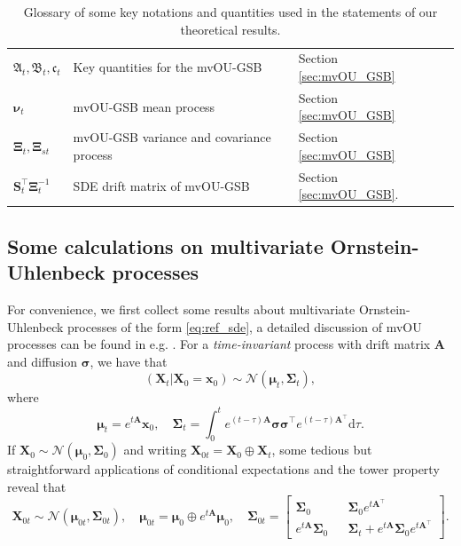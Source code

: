 \documentclass{article}
\newcommand{\diff}{\mathrm{d}}
\newcommand{\Nc}{\mathcal{N}}
\newcommand{\bmathfrak}[1]{\bm{\mathfrak{#1}}}
\theoremstyle{newstyle}
\begin{document}
\begin{table}[h]
\begin{tabular}{llll}
    $\bmathfrak{A}_t, \bmathfrak{B}_t, \bmathfrak{c}_t$ & Key quantities for the mvOU-GSB & Section \ref{sec:mvOU_GSB} \\
    $\bm{\nu}_t$ & mvOU-GSB mean process & Section \ref{sec:mvOU_GSB} \\ 
    $\bm{\Xi}_t, \bm{\Xi}_{st}$ & mvOU-GSB variance and covariance process & Section \ref{sec:mvOU_GSB} \\ 
    $\bm{S}_t^\top \bm{\Xi}_t^{-1}$ & SDE drift matrix of mvOU-GSB & Section \ref{sec:mvOU_GSB}.  \\ 
    \bottomrule
\end{tabular}
\caption{Glossary of some key notations and quantities used in the statements of our theoretical results.}
\label{tab:glossary}
\end{table}

\subsection{Some calculations on multivariate Ornstein-Uhlenbeck processes}\label{sec:mvOU_calculations}

For convenience, we first collect some results about multivariate Ornstein-Uhlenbeck processes of the form \eqref{eq:ref_sde}, a detailed discussion of mvOU processes can be found in e.g. \cite{vatiwutipong2019alternative}. 
  For a \emph{time-invariant} process with drift matrix $\bm{A}$ and diffusion $\bm{\sigma}$, we have that
  \[
    (\bm{X}_t | \bm{X}_0 = \bm{x}_0) \sim \Nc(\bm{\mu}_t, \bm{\Sigma}_t),
  \]
  where 
  \begin{equation}
    \bm{\mu}_t = e^{t\bm{A}} \bm{x}_0, \quad \bm{\Sigma}_t = \int_0^t e^{(t - \tau) \bm{A}} \bm{\sigma} \bm{\sigma}^\top e^{(t - \tau) \bm{A}^\top} \diff \tau. 
  \end{equation}
  If $\bm{X}_0 \sim \Nc(\bm{\mu}_0, \bm{\Sigma}_0)$ and writing $\bm{X}_{0t} = \bm{X}_0 \oplus \bm{X}_t$, some tedious but straightforward applications of conditional expectations and the tower property reveal that
\begin{equation}
    \bm{X}_{0t} \sim \Nc(\bm{\mu}_{0t}, \bm{\Sigma}_{0t}), \quad \bm{\mu}_{0t} = \bm{\mu}_0 \oplus e^{t\bm{A}} \bm{\mu}_0, \quad \bm{\Sigma}_{0t} = \begin{bmatrix} \bm{\Sigma}_0 && \bm{\Sigma}_0 e^{t\bm{A}^\top} \\ e^{t\bm{A}} \bm{\Sigma}_0 && \bm{\Sigma}_t + e^{t\bm{A}} \bm{\Sigma}_0 e^{t\bm{A}^\top} \end{bmatrix}. 
  \end{equation}
\end{document}
